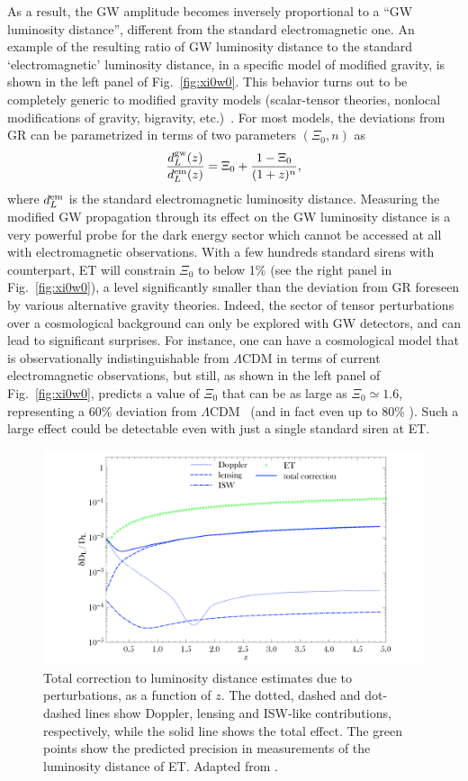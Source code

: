 As a result, the GW amplitude becomes inversely proportional to a ``GW luminosity distance'', different from the standard electromagnetic one. An example of the  resulting ratio of GW luminosity distance to the standard `electromagnetic' luminosity distance, in a specific model of modified gravity, is shown in the left panel of Fig.~\ref{fig:xi0w0}.
This behavior turns out to be  completely generic to  modified gravity models (scalar-tensor theories, nonlocal modifications of gravity, bigravity, etc.)~\cite{Belgacem:2019pkk}. For most models, the deviations from GR can be parametrized in terms of two parameters $(\Xi_0,n)$  as~\cite{Belgacem:2018lbp}
\begin{equation}
\frac{d_L^{\rm gw}(z)}{d_L^{\rm em}(z)}=\Xi_0+\frac{1-\Xi_0}{(1+z)^n},
\end{equation}
where $d_L^{\rm em}$ is the standard electromagnetic luminosity distance. Measuring the modified GW propagation through its effect on the GW luminosity distance is a very powerful probe for the dark energy sector which cannot be accessed at all with  electromagnetic  observations. With a few hundreds standard sirens with counterpart, ET will constrain $\Xi_0$ to below 1\% (see the right panel in Fig.~\ref{fig:xi0w0}), a level significantly  smaller than the deviation from GR foreseen by various alternative gravity theories. Indeed, the sector of tensor perturbations over a cosmological background  can only be explored with  GW detectors, and can lead to significant surprises. For instance, one can have a cosmological model that is  observationally indistinguishable from 
$\Lambda$CDM in terms of current electromagnetic observations,
 but still, as shown in the left panel of  Fig.~\ref{fig:xi0w0}, predicts a value of $\Xi_0$  that can be as large as $\Xi_0\simeq 1.6$, representing a $60\%$ deviation from $\Lambda$CDM~\cite{Belgacem:2019lwx} (and in fact even up to $80\%$ \cite{Belgacem:2020pdz}).
Such a large effect could be detectable even with just a single standard siren at ET.


\begin{figure}[t]
\centering
\includegraphics[width=0.65\columnwidth]{Figures/ET-D_L.pdf}
\caption{Total correction to luminosity distance estimates due to perturbations, as a function of $z$. The dotted, dashed and dot-dashed lines show Doppler, lensing and ISW-like contributions, respectively, while the solid line shows the total effect. The green
points show the predicted precision in measurements of the luminosity distance of ET. Adapted from \cite{Bertacca:2017vod}.}
\label{fig:final}
\end{figure}


